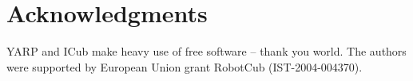 
\section{Acknowledgments}

YARP and ICub make heavy use of free software -- thank
you world.  The authors were supported by European Union
grant RobotCub (IST-2004-004370).




